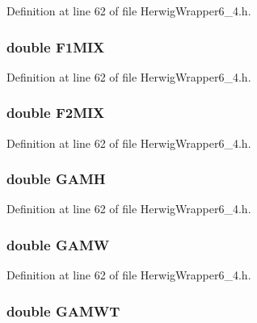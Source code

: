 Definition at line 62 of file Herwig\-Wrapper6\_\-4.h.
\subsubsection{\setlength{\rightskip}{0pt plus 5cm}double {\bf F1MIX}}\label{HerwigWrapper6__4_8h_f7db22da7a2c9d0019a64ac2861f0159}




Definition at line 62 of file Herwig\-Wrapper6\_\-4.h.
\subsubsection{\setlength{\rightskip}{0pt plus 5cm}double {\bf F2MIX}}\label{HerwigWrapper6__4_8h_11622711dcdacebe397fb29fbf1b76d1}




Definition at line 62 of file Herwig\-Wrapper6\_\-4.h.
\subsubsection{\setlength{\rightskip}{0pt plus 5cm}double {\bf GAMH}}\label{HerwigWrapper6__4_8h_cc355485e91270e170bfe171a4d3b1f0}




Definition at line 62 of file Herwig\-Wrapper6\_\-4.h.
\subsubsection{\setlength{\rightskip}{0pt plus 5cm}double {\bf GAMW}}\label{HerwigWrapper6__4_8h_0c831e05c066c1cc15ed8f613ed48ad0}




Definition at line 62 of file Herwig\-Wrapper6\_\-4.h.
\subsubsection{\setlength{\rightskip}{0pt plus 5cm}double {\bf GAMWT}}\label{HerwigWrapper6__4_8h_c2019e248997c23870fc9a28c349dafa}




